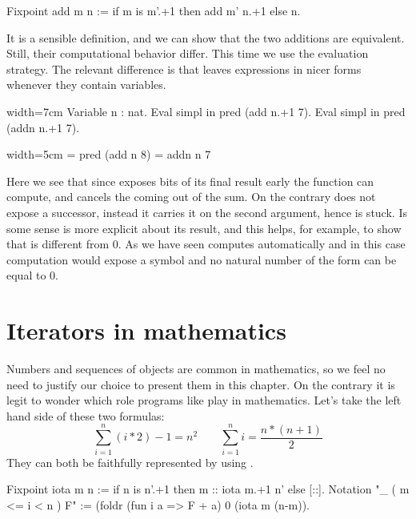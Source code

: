 \begin{coq}{}{}
Fixpoint add m n := if m is m'.+1 then add m' n.+1 else n.
\end{coq}

It is a sensible definition, and we can show that the two additions
are equivalent.  Still, their computational behavior differ.
This time we use the  evaluation strategy.  The relevant difference
is that  leaves expressions in nicer forms whenever they contain
variables.

\begin{coq}{}{width=7cm}
Variable n : nat.
Eval simpl in pred (add n.+1 7).
Eval simpl in pred (addn n.+1 7).
\end{coq}
\begin{coqout}{}{width=5cm}
= pred (add n 8)
= addn n 7
\end{coqout}

Here we see that since  exposes bits of its
final result early the  function can compute, and cancels
the  coming out of the sum.  On the contrary
 does not expose a successor, instead it carries it on the second
argument, hence  is stuck.  Is some sense  is more
explicit about its result, and this helps, for example, to show that
 is different from 0. As we have seen \Coq{} computes
automatically and in this case computation would expose a  symbol
and no natural number of the form  can be equal to 0.

\section{Iterators in mathematics}

Numbers and sequences of objects are common in mathematics, so we feel
no need to justify our choice to present them in this chapter.
On the contrary it is legit to wonder which role programs like 
play in mathematics.
Let's take the left hand side of these two formulas:
$$
\sum_{i=1}^n (i * 2) - 1 = n ^ 2 \qquad
\sum_{i=1}^n i = \frac{n * (n + 1)}{2}
$$
They can both be faithfully represented by using .

\begin{coq}{}{}
Fixpoint iota m n := if n is n'.+1 then m :: iota m.+1 n' else [::].
Notation "\sum_ ( m <= i < n ) F" :=
  (foldr (fun i a => F + a) 0 (iota m (n-m)).
\end{coq}

